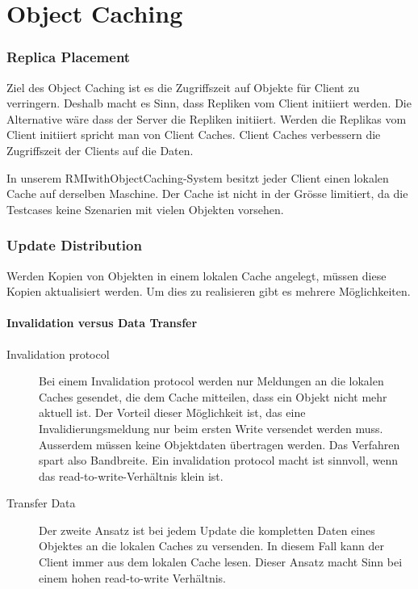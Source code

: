 \chapter{Object Caching}

\label{sec:object-caching}

\subsection{Replica Placement}
\label{sec:replica-management}

Ziel des Object Caching ist es die Zugriffszeit auf Objekte für Client zu verringern. Deshalb macht es Sinn, dass Repliken vom Client initiiert werden. Die Alternative wäre dass der Server die Repliken initiiert. Werden die Replikas vom Client initiiert spricht man von Client Caches. Client Caches verbessern die Zugriffszeit der Clients auf die Daten.

In unserem RMIwithObjectCaching-System besitzt jeder Client einen lokalen Cache auf derselben Maschine. Der Cache ist nicht in der Grösse limitiert, da die Testcases keine Szenarien mit vielen Objekten vorsehen.

\subsection{Update Distribution}
\label{sec:update-distribution}

Werden Kopien von Objekten in einem lokalen Cache angelegt, müssen diese Kopien aktualisiert werden. Um dies zu realisieren gibt es mehrere Möglich\-keiten.

\subsubsection{Invalidation versus Data Transfer}
\label{sec:inval-vers-data}

\begin{description}
\item[Invalidation protocol] Bei einem Invalidation protocol werden nur Meldungen an die lokalen Caches gesendet, die dem Cache mitteilen, dass ein Objekt nicht mehr aktuell ist. Der Vorteil dieser Möglichkeit ist, das eine Invalidierungsmeldung nur beim ersten Write versendet werden muss. Ausserdem müssen keine Objektdaten übertragen werden. Das Verfahren spart also Bandbreite. Ein invalidation protocol macht ist sinnvoll, wenn das read-to-write-Verhältnis klein ist.
\item[Transfer Data] Der zweite Ansatz ist bei jedem Update die kompletten Daten eines Objektes an die lokalen Caches zu versenden. In diesem Fall kann der Client immer aus dem lokalen Cache lesen. Dieser Ansatz macht Sinn bei einem hohen read-to-write Verhältnis.
\end{description}


